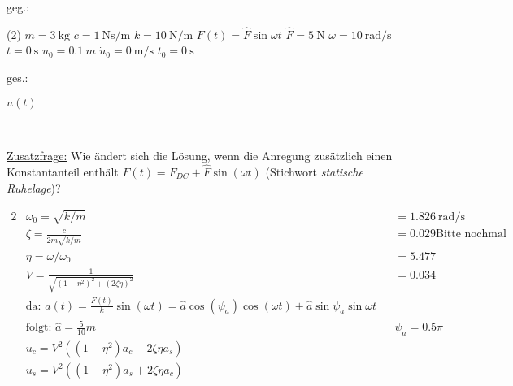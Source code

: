     


    \begin{minipage}[t]{.49\linewidth}
        geg.:
        \begin{tasks} (2)
           \task[] $m = \SI{3}{\kilo\gram}$
           \task[] $c = \SI{1}{\newton\second\per\meter}$
           \task[] $k = \SI{10}{\newton\per\meter}$
            \task[] $F(t) = \hat{F} \sin{\omega t}$
           \task[] $\hat{F} = \SI{5}{\newton}$
           \task[] $\omega = \SI{10}{\radian\per\second}$
           \task[] $t=\SI{0}{\second}$
           \task[] $u_0 = \SI{0.1}{m}$
           \task[] $\dot{u}_0 = \SI{0}{\meter\per\second}$
           \task[] $t_0 = \SI{0}{\second}$
        \end{tasks}
        \end{minipage}
        \begin{minipage}[t]{.49\linewidth}
        ges.:
        \begin{tasks}
            \task[] $u(t)$
        \end{tasks}
    \end{minipage}\\
    \vspace{1cm}

    \underline{Zusatzfrage:} Wie ändert sich die Lösung, wenn die Anregung zusätzlich einen Konstantanteil enthält $F(t) = F_{DC} +\hat{F} \sin{(\omega t)}$ (Stichwort \textit{statische Ruhelage})?

    \begin{solution}
        \begin{alignat*}{2}
            &\omega_0 = \sqrt{k/m} &&= \SI{1.826}{\radian\per\second} \\
            &\zeta = \frac{c}{2m\sqrt{k/m}} &&= 0.029 \text{Bitte nochmal berechnen!} \\
            &\eta = \omega/\omega_0 &&= 5.477\\
            &V = \frac{1}{\sqrt{(1 - \eta^2)^2 + (2\zeta\eta)^2}} &&= 0.034\\
            &\text{da: } a(t) = \frac{F(t)}{k} \sin(\omega t) = \hat{a} \cos(\psi_a) \cos(\omega t) + \hat{a} \sin{\psi_a} \sin{\omega t} \\
            &\text{folgt: } \hat{a} = \frac{5}{10}m && \psi_a = 0.5\pi \\
            &u_c = V^2((1-\eta^2)a_c - 2 \zeta \eta a_s) \\
            &u_s = V^2((1 - \eta^2)a_s + 2 \zeta \eta a_c) \\
        \end{alignat*}
    \end{solution}
        
